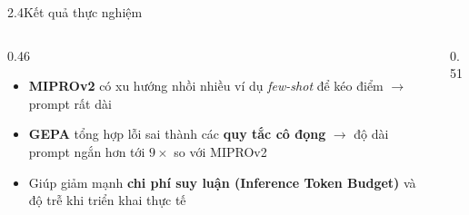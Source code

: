 \begin{frame}{2.4\quad Kết quả thực nghiệm}
  \begin{columns}[T,onlytextwidth]
    \begin{column}{0.46\textwidth}
      \begin{itemize}\setlength{\itemsep}{0.55em}
        \item \textbf{MIPROv2} có xu hướng nhồi nhiều ví dụ \textit{few-shot} để kéo điểm
              $\rightarrow$ prompt rất dài
        \item \textbf{GEPA} tổng hợp lỗi sai thành các \textbf{quy tắc cô đọng}
              $\rightarrow$ độ dài prompt ngắn hơn tới \textbf{$9\times$} so với MIPROv2
        \item Giúp giảm mạnh \textbf{chi phí suy luận (Inference Token Budget)} và độ trễ
              khi triển khai thực tế
      \end{itemize}
    \end{column}
    \begin{column}{0.51\textwidth}
      \centering
      \par{}
    \end{column}
  \end{columns}
\end{frame}

